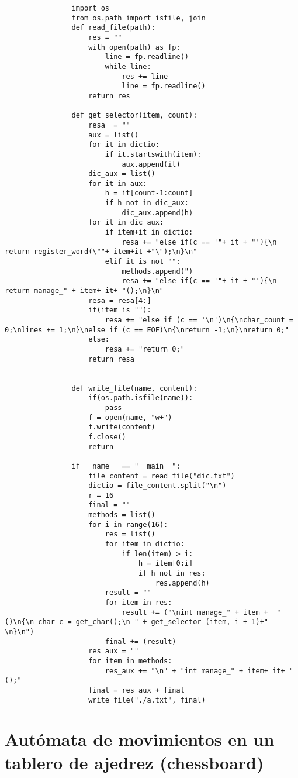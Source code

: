 \documentclass[11pt,a4paper]{report}
\begin{document}
			\begin{lstlisting}
				import os
				from os.path import isfile, join
				def read_file(path):
				    res = ""
				    with open(path) as fp:
				        line = fp.readline()
				        while line:
				            res += line
				            line = fp.readline()
				    return res
				
				def get_selector(item, count):
				    resa  = ""
				    aux = list()
				    for it in dictio:
				        if it.startswith(item):
				            aux.append(it)
				    dic_aux = list()
				    for it in aux:
				        h = it[count-1:count]
				        if h not in dic_aux:
				            dic_aux.append(h)
				    for it in dic_aux:
				        if item+it in dictio:
				            resa += "else if(c == '"+ it + "'){\n return register_word(\""+ item+it +"\");\n}\n"
				        elif it is not "":
				            methods.append(")
				            resa += "else if(c == '"+ it + "'){\n return manage_" + item+ it+ "();\n}\n"
				    resa = resa[4:]
				    if(item is ""):
				        resa += "else if (c == '\n')\n{\nchar_count = 0;\nlines += 1;\n}\nelse if (c == EOF)\n{\nreturn -1;\n}\nreturn 0;"
				    else:
				        resa += "return 0;"
				    return resa
				
				
				def write_file(name, content):
				    if(os.path.isfile(name)):
				        pass
				    f = open(name, "w+")
				    f.write(content)
				    f.close()
				    return
				
				if __name__ == "__main__":
				    file_content = read_file("dic.txt")
				    dictio = file_content.split("\n")
				    r = 16
				    final = ""
				    methods = list()
				    for i in range(16):
				        res = list()
				        for item in dictio:
				            if len(item) > i:
				                h = item[0:i]
				                if h not in res:
				                    res.append(h)
				        result = ""
				        for item in res:
				            result += ("\nint manage_" + item +  "()\n{\n char c = get_char();\n " + get_selector (item, i + 1)+" \n}\n")
				        final += (result)
				    res_aux = ""
				    for item in methods:
				        res_aux += "\n" + "int manage_" + item+ it+ "();"
				    final = res_aux + final
				    write_file("./a.txt", final)
	            \end{lstlisting}



	\chapter{Autómata de movimientos en un tablero de ajedrez (chessboard)}
	 
\end{document}
